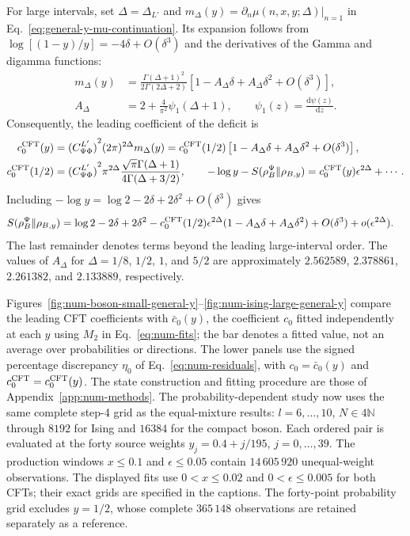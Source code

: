 \documentclass[11pt]{article}
\newcommand{\ep}{\epsilon}
\newcommand{\p}{\partial}
\begin{document}
For large intervals, set $\Delta=\Delta_{L'}$ and
$m_\Delta(y)=\left.\p_n\mu(n,x,y;\Delta)\right|_{n=1}$ in
Eq.~\eqref{eq:general-y-mu-continuation}. Its expansion follows from
$\log[(1-y)/y]=-4\delta+O(\delta^3)$ and the derivatives of the
Gamma and digamma functions:
\begin{align}
 m_\Delta(y)&=\frac{\Gamma(\Delta+1)^2}{2\Gamma(2\Delta+2)}
 \left[1-A_\Delta\delta+A_\Delta\delta^2+O(\delta^3)\right],
 \nonumber\\
 A_\Delta&=2+\frac{4}{\pi^2}\psi_1(\Delta+1),
 \qquad \psi_1(z)=\frac{\mathrm d\psi(z)}{\mathrm dz}.
 \label{eq:num-general-y-mu-expansion}
\end{align}
Consequently, the leading coefficient of the deficit is
\begin{align}
 c_0^{\rm CFT}(y)
 &={(C_{\Psi\Phi}^{L'})}^2(2\pi)^{2\Delta}m_\Delta(y)
 =c_0^{\rm CFT}(1/2)
 \left[1-A_\Delta\delta+A_\Delta\delta^2+O(\delta^3)\right],
 \nonumber\\
 c_0^{\rm CFT}(1/2)
 &={(C_{\Psi\Phi}^{L'})}^2\pi^{2\Delta}
 \frac{\sqrt\pi\Gamma(\Delta+1)}{4\Gamma(\Delta+3/2)},
 \qquad -\log y-S(\rho_B^\Psi\|\rho_{B,y})
 =c_0^{\rm CFT}(y)\ep^{2\Delta}+\cdots.
 \label{eq:num-general-y-large}
\end{align}
Including $-\log y=\log2-2\delta+2\delta^2+O(\delta^3)$ gives
\begin{align}
 S(\rho_B^\Psi\|\rho_{B,y})
 &=\log2-2\delta+2\delta^2
 -c_0^{\rm CFT}(1/2)\ep^{2\Delta}
 (1-A_\Delta\delta+A_\Delta\delta^2)
 +O(\delta^3)+o(\ep^{2\Delta}).
 \label{eq:num-general-y-entropy-expansion}
\end{align}
The last remainder denotes terms beyond the leading large-interval
order. The values of $A_\Delta$ for $\Delta=1/8$, $1/2$, $1$, and $5/2$
are approximately $2.562589$, $2.378861$, $2.261382$, and $2.133889$,
respectively.

Figures~\ref{fig:num-boson-small-general-y}--\ref{fig:num-ising-large-general-y}
compare the leading CFT coefficients with $\bar c_0(y)$, the coefficient
$c_0$ fitted independently at each $y$ using $M_2$ in
Eq.~\eqref{eq:num-fits}; the bar denotes a fitted value, not an average
over probabilities or directions. The lower panels use the signed
percentage discrepancy $\eta_0$ of Eq.~\eqref{eq:num-residuals}, with
$c_0=\bar c_0(y)$ and $c_0^{\rm CFT}=c_0^{\rm CFT}(y)$.
The state construction and fitting procedure are those of
Appendix~\ref{app:num-methods}. The probability-dependent study now
uses the same complete step-4 grid as the equal-mixture results:
$l=6,\ldots,10$, $N\in4\mathbb N$ through $8192$ for Ising and
$16384$ for the compact boson. Each ordered pair is evaluated at
the forty source weights $y_j=0.4+j/195$, $j=0,\ldots,39$.
The production windows $x\leq0.1$ and $\ep\leq0.05$ contain
$14\,605\,920$ unequal-weight observations. The displayed fits
use $0<x\leq0.02$ and $0<\ep\leq0.005$ for both CFTs;
their exact grids are specified in the captions. The forty-point
probability grid excludes $y=1/2$, whose complete $365\,148$
observations are retained separately as a reference.
\end{document}
